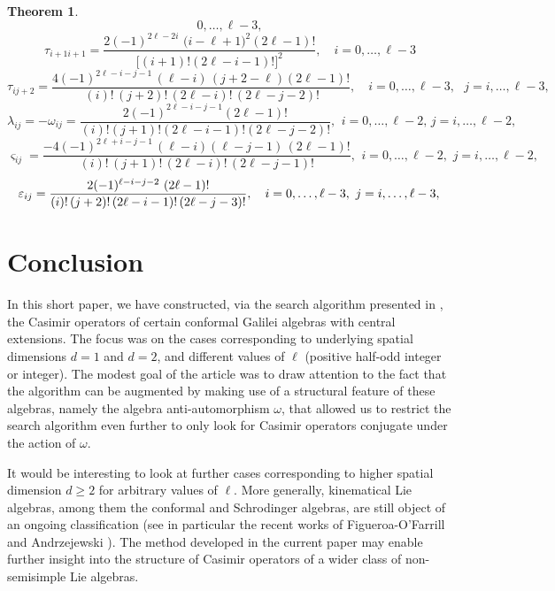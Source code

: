 \documentclass[12pt]{article}
\newtheorem{thm}{Theorem}
\begin{document}
\begin{thm}
$$  0,\ldots, \ell-3, 
$$
$$
    \tau_{i+1i+1}= \frac{  2(-1)^{2\ell-2i}\,\, \Big(i-\ell+1 \Big)^2
    (2\ell-1)! }{ \Big [ (i+1)!(2\ell-i-1)!\Big]^2}, \quad  i= 0,\ldots, \ell-3
$$
$$
     \tau_{ij+2}= \frac{  4(-1)^{2\ell-i-j-1}\,(\ell-i)\, (j+2-\ell)(2\ell-1)!
     }{\,(i)! \,(j+2)!\, (2\ell-i)!\, (2\ell-j-2)!}, \quad  i= 0,\ldots,
     \ell-3,\,\,\,\, j=i,\ldots, \ell-3,
     $$
     $$
  \lambda_{ij}=- \omega_{ij}=
  \frac{  2(-1)^{2\ell-i-j-1}(2\ell-1)! }{(i)!(j+1)!(2\ell-i-1)!(2\ell-j-2)!},
  \,\   i= 0,\ldots, \ell-2, \, j= i,\ldots, \ell-2,
  $$
  $$
      \varsigma_{ij}= \frac{  -4(-1)^{2\ell+i-j-1}\,(\ell-i)
      (\ell-j-1)\,(2\ell-1)! }{(i)!\,(j+1)!\,(2\ell-i)!\,(2\ell-j-1)!},\,\ i=
      0,\ldots, \ell-2,\,\, j= i,\ldots, \ell-2,
      $$
      $$
      \varepsilon_{ij}= \frac{  2(-1)^{\ell-i-j-2}\,\,(2\ell-1)!
      }{(i)!\,(j+2)!\,(2\ell-i-1)!\,(2\ell-j-3)!},\quad i= 0,\ldots,
      \ell-3,\,\, j= i,\ldots, \ell-3,\\ 
  $$
\end{thm}

\section{Conclusion}

In this short paper, we have constructed, via the search algorithm presented in
\cite{Als17}, the Casimir operators of certain
conformal Galilei algebras with central extensions. The focus was on the cases
corresponding to underlying spatial dimensions $d=1$
and $d=2$, and different values of $\ell$ (positive half-odd integer or integer).
The modest goal of the article was to draw attention to the fact that the
algorithm can be augmented by making use of a structural feature of these
algebras, namely the algebra anti-automorphism $\omega$, that allowed us to
restrict the search algorithm even further to only look for Casimir operators
conjugate under the action of $\omega$. 

It would be interesting to look at further cases corresponding to higher
spatial dimension $d \geq 2 $ for arbitrary values of $\ell$. More generally,
kinematical Lie algebras, among them the conformal and Schrodinger algebras,
are still object of an ongoing classification (see in particular the recent
works of Figueroa-O'Farrill and Andrzejewski \cite{Fig18e1,AndFig18,Fig18e2}). The method
developed in the current paper may enable further insight into the structure of
Casimir operators of a wider class of non-semisimple Lie algebras.
\end{document}

